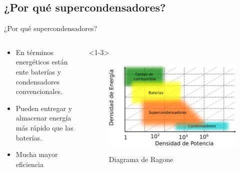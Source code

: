 \documentclass[aspectratio=169]{beamer}
\begin{document}
	\subsection{¿Por qué supercondensadores?}
	\begin{frame}{¿Por qué supercondensadores?}
		\begin{columns}
			\begin{column}{0.5\textwidth}
				\begin{itemize}
					\item<1-> En términos energéticos están ente baterías y condensadores convencionales.
					\item<2-> Pueden entregar y almacenar energía más rápido que las baterías.
					\item<3-> Mucha mayor eficiencia
				\end{itemize}
			\end{column}
			\begin{column}{0.5\textwidth}
				\begin{onlyenv}<1-3>
					\begin{figure}
						\centering
						{
							\includegraphics[width = \textwidth]{ragone.pdf}
						}
						\caption{Diagrama de Ragone}
					\end{figure}
				\end{onlyenv}
			\end{column}
		\end{columns}
	\end{frame}

%
%
\end{document}
